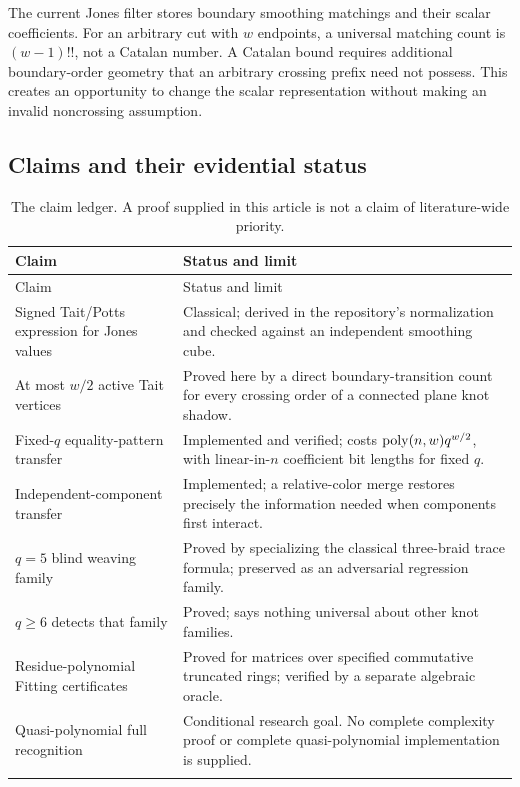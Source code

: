 The current Jones filter stores boundary smoothing matchings and their
scalar coefficients. For an arbitrary cut with $w$ endpoints, a universal
matching count is $(w-1)!!$, not a Catalan number. A Catalan bound requires
additional boundary-order geometry that an arbitrary crossing prefix need
not possess. This creates an opportunity to change the scalar representation
without making an invalid noncrossing assumption.

\subsection{Claims and their evidential status}

\begingroup\small
\begin{longtable}{@{}>{\raggedright\arraybackslash}p{}p{}@{}}
\toprule
Claim & Status and limit\\
\midrule
\endfirsthead
\toprule Claim & Status and limit\\ \midrule
\endhead
Signed Tait/Potts expression for Jones values &
Classical; derived in the repository's normalization and checked against an
independent smoothing cube.\\
At most $w/2$ active Tait vertices &
Proved here by a direct boundary-transition count for every crossing order
of a connected plane knot shadow.\\
Fixed-$q$ equality-pattern transfer &
Implemented and verified; costs $\operatorname{poly}(n,w)q^{w/2}$, with linear-in-$n$
coefficient bit lengths for fixed $q$.\\
Independent-component transfer &
Implemented; a relative-color merge restores precisely the information
needed when components first interact.\\
$q=5$ blind weaving family &
Proved by specializing the classical three-braid trace formula; preserved as
an adversarial regression family.\\
$q\ge6$ detects that family &
Proved; says nothing universal about other knot families.\\
Residue-polynomial Fitting certificates &
Proved for matrices over specified commutative truncated rings; verified by
a separate algebraic oracle.\\
Quasi-polynomial full recognition &
Conditional research goal. No complete complexity proof or complete
quasi-polynomial implementation is supplied.\\
\bottomrule
\caption{The claim ledger. A proof supplied in this article is not a claim
of literature-wide priority.}
\label{tab:claims}\\
\end{longtable}
\endgroup

